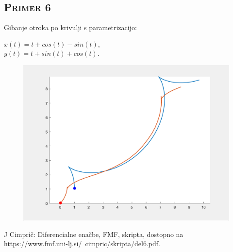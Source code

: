 \documentclass[a4paper,12pt]{article}
\begin{document}
    \newpage
    \subsection{\textsc{Primer 6}}
    Gibanje otroka po krivulji s parametrizacijo:
    \begin{center}
    $x(t) = t + cos(t) - sin(t)$, \\
    $y(t) = t + sin(t) + cos(t)$. 
    \end{center}      
    \begin{figure}[!h]
        \centering
        \includegraphics[scale=0.4]{Primer5}
    \end{figure}

\newpage

\newpage	
\begin{thebibliography}{99}
	J Cimprič: Diferencialne enačbe, FMF, skripta, dostopno na https://www.fmf.uni-lj.si/~cimpric/skripta/del6.pdf.

\end{thebibliography}
\end{document}
